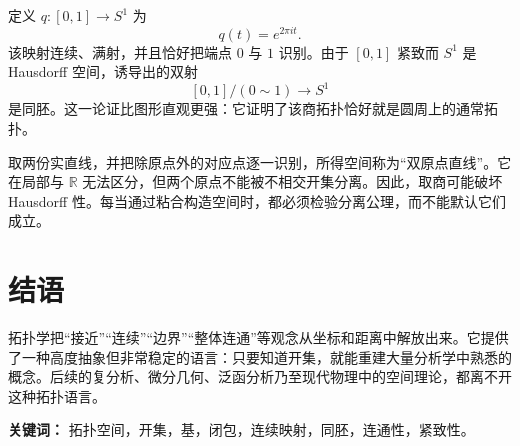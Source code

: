 \begin{example}[由区间得到圆周]
定义 $q:[0,1]\to S^1$ 为
\[
    q(t)=e^{2\pi i t}.
\]
该映射连续、满射，并且恰好把端点 $0$ 与 $1$ 识别。由于 $[0,1]$ 紧致而 $S^1$ 是 Hausdorff 空间，诱导出的双射
\[
    [0,1]/(0\sim1)\longrightarrow S^1
\]
是同胚。这一论证比图形直观更强：它证明了该商拓扑恰好就是圆周上的通常拓扑。
\end{example}

\begin{example}
取两份实直线，并把除原点外的对应点逐一识别，所得空间称为“双原点直线”。它在局部与 $\mathbb{R}$ 无法区分，但两个原点不能被不相交开集分离。因此，取商可能破坏 Hausdorff 性。每当通过粘合构造空间时，都必须检验分离公理，而不能默认它们成立。
\end{example}


\section{结语}

拓扑学把“接近”“连续”“边界”“整体连通”等观念从坐标和距离中解放出来。它提供了一种高度抽象但非常稳定的语言：只要知道开集，就能重建大量分析学中熟悉的概念。后续的复分析、微分几何、泛函分析乃至现代物理中的空间理论，都离不开这种拓扑语言。

\textbf{关键词：} 拓扑空间，开集，基，闭包，连续映射，同胚，连通性，紧致性。
